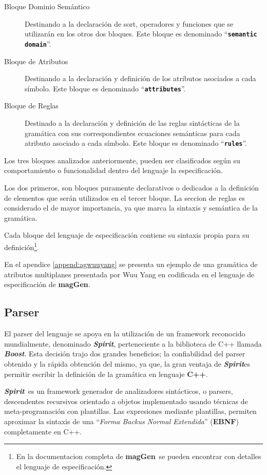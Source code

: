 \documentclass[runningheads,a4paper]{llncs}
\newcommand{\textbtt}[1]{\texttt{\textbf{#1}}}
\newcommand{\maggen}{\textbf{magGen}}
\newcommand{\boost}{\textit{\textbf{Boost}}}
\newcommand{\spirit}{\textit{\textbf{Spirit}}}
\begin{document}
\begin{description}
\item [Bloque Dominio Semántico] Destinando a la declaración de sort, operadores y funciones que se utilizarán en los otros dos bloques. Este bloque es denominado ``\textbtt{semantic domain}''.

\item [Bloque de Atributos] Destinando a la declaración y definición de los atributos asociados a cada símbolo. Este bloque es denominado ``\textbtt{attributes}''.

\item [Bloque de Reglas] Destinado a la declaración y definición de las reglas sintácticas de la gramática con sus correspondientes ecuaciones semánticas para cada atributo asociado a cada símbolo. Este bloque es denominado ``\textbtt{rules}''.
\end{description}

Los tres bloques analizados anteriormente, pueden ser clasificados según su comportamiento o funcionalidad dentro del lenguaje la especificación.

Los dos primeros, son bloques puramente declarativos o dedicados a la definición de elementos que serán utilizados en el tercer bloque. La seccion de reglas es considerado el de mayor importancia, ya que marca la sintaxis y semántica de la gramática.

Cada bloque del lenguaje de especificación contiene su sintaxis propia para su definición\footnote{En la documentacion completa de \maggen\ se pueden encontrar con detalles el lenguaje de especificación.}.

En el apendice \ref{append:agwuuyang} se presenta un ejemplo de una gramática de atributos multiplanes presentada por Wuu Yang en \cite{wuu-yang1} codificada en el lenguaje de especificación de \maggen.

\subsection{Parser}

El parser del lenguaje se apoya en la utilización de un framework reconocido mundialmente, denominado \spirit, perteneciente a la biblioteca de C++ llamada \boost. Esta decisión trajo dos grandes beneficios; la confiabilidad del parser obtenido y la rápida obtención del mismo, ya que, la gran ventaja de \spirit es permitir escribir la definición de la gramática en lenguaje \textbf{C++}.

\spirit\ es un framework generador de analizadores sintácticos, o parsers, descendentes recursivos orientado a objetos implementado usando técnicas de meta-programación con plantillas. Las expresiones mediante plantillas, permiten aproximar la sintaxis de una ``\textit{\textit{Forma Backus Normal Extendida}}'' (\textbf{EBNF}) completamente en C++.
\end{document}
